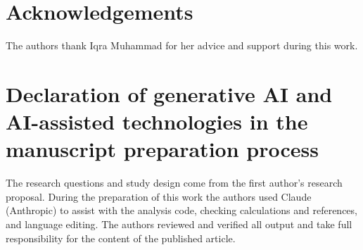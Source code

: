 \documentclass[preprint,12pt]{elsarticle}
\theoremstyle{remark}
\theoremstyle{definition}
\begin{document}
\section*{Acknowledgements}
The authors thank Iqra Muhammad for her advice and support during this work.

\section*{Declaration of generative AI and AI-assisted technologies in the manuscript preparation process}
The research questions and study design come from the first author's research proposal. During the preparation of this work the authors used Claude (Anthropic) to assist with the analysis code, checking calculations and references, and language editing. The authors reviewed and verified all output and take full responsibility for the content of the published article.



\end{document}
